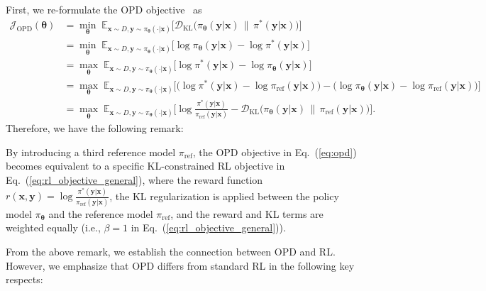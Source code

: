 \documentclass{article} %
\begin{document}
First, we re-formulate the OPD objective~\citep{il_rlhf} as
\begin{equation}
\label{eq:op_derivation}
\begin{aligned}
\mathcal{J}_{\text{OPD}}(\boldsymbol{\theta}) &=  \min_{\boldsymbol{\theta}}\;
\mathbb{E}_{\boldsymbol{x} \sim D, \boldsymbol{y} \sim \pi_{\boldsymbol{\theta}} (\cdot | \boldsymbol{x}) }\Big[
\mathcal{D}_{\mathrm{KL}} \!\big(
\pi_{\boldsymbol{\theta}}(\boldsymbol{y} | \boldsymbol{x})
\,\big\|\,
\pi^{*}( \boldsymbol{y} | \boldsymbol{x})
\big)
\Big] \\ & = \min_{\boldsymbol{\theta}}\;
\mathbb{E}_{\boldsymbol{x} \sim D, \boldsymbol{y} \sim \pi_{\boldsymbol{\theta}} (\cdot | \boldsymbol{x}) }\Big[
\log \pi_{\boldsymbol{\theta}}(\boldsymbol{y}| \boldsymbol{x} ) - \log \pi^{*}(\boldsymbol{y}| \boldsymbol{x} )
\Big] \\ & =
\max_{\boldsymbol{\theta}}\;
\mathbb{E}_{\boldsymbol{x} \sim D, \boldsymbol{y} \sim \pi_{\boldsymbol{\theta}} (\cdot | \boldsymbol{x}) }\Big[
\log \pi^{*}(\boldsymbol{y}| \boldsymbol{x} ) - \log \pi_{\boldsymbol{\theta}}(\boldsymbol{y}| \boldsymbol{x} ) \Big]  \\ &=
\max_{\boldsymbol{\theta}}\;
\mathbb{E}_{\boldsymbol{x} \sim D, \boldsymbol{y} \sim \pi_{\boldsymbol{\theta}} (\cdot | \boldsymbol{x}) }\Big[
\big(\log \pi^{*}(\boldsymbol{y}| \boldsymbol{x} ) - \log \pi_{\mathrm{ref}} (\boldsymbol{y}| \boldsymbol{x} ) \big) - \big( \log \pi_{\boldsymbol{\theta}}(\boldsymbol{y}| \boldsymbol{x} ) - \log \pi_{\mathrm{ref}} (\boldsymbol{y}| \boldsymbol{x} ) \big)
\Big] \\ & =
\max_{\boldsymbol{\theta}}\;
\mathbb{E}_{\boldsymbol{x} \sim D, \boldsymbol{y} \sim \pi_{\boldsymbol{\theta}} (\cdot | \boldsymbol{x}) }\Big[
\log  \frac{\pi^{*}(\boldsymbol{y}| \boldsymbol{x} )}{\pi_{\mathrm{ref}} (\boldsymbol{y}| \boldsymbol{x} )}  - \mathcal{D}_{\mathrm{KL}} \!\big(
\pi_{\boldsymbol{\theta}}(\boldsymbol{y} | \boldsymbol{x})
\,\big\|\,
\pi_{\mathrm{ref}}( \boldsymbol{y} | \boldsymbol{x})
\big)
\Big].
\end{aligned}
\end{equation}
Therefore, we have the following remark:
\begin{remark}
    By introducing a third reference model $\pi_{\mathrm{ref}}$, the OPD objective in Eq.~(\ref{eq:opd}) becomes equivalent to a specific KL-constrained RL objective in Eq.~(\ref{eq:rl_objective_general}), where the reward function $r(\boldsymbol{x},\boldsymbol{y})=\log \frac{\pi^{*}(\boldsymbol{y} | \boldsymbol{x})}{\pi_{\mathrm{ref}}(\boldsymbol{y} | \boldsymbol{x})}$, the KL regularization is applied between the policy model $\pi_{\boldsymbol{\theta}}$ and the reference model $\pi_{\mathrm{ref}}$, and the reward and KL terms are weighted equally (i.e., $\beta=1$ in Eq.~(\ref{eq:rl_objective_general})).
\end{remark}
From the above remark, we establish the connection between OPD and RL. However, we emphasize that OPD differs from standard RL in the following key respects:
\end{document}
